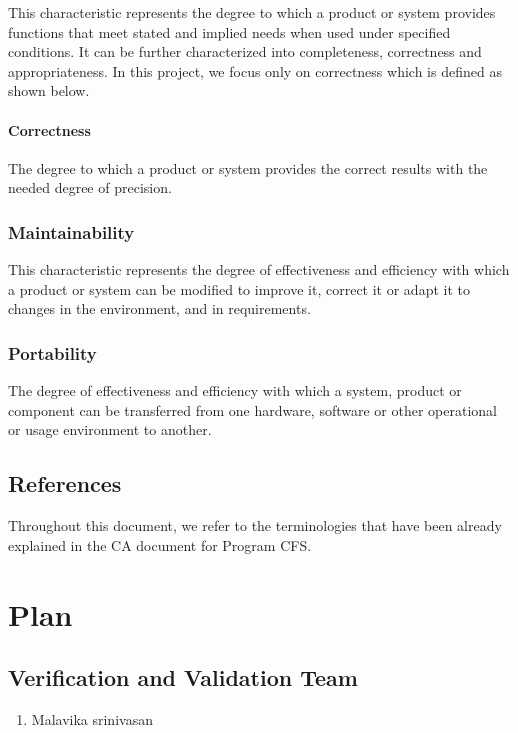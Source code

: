 \documentclass[12pt, titlepage]{article}
\newcommand{\famname}{CFS} %
\begin{document}
This characteristic represents the degree to which a product or system provides
functions that meet stated and implied needs when used under specified
conditions. It can be further characterized into completeness, correctness and
appropriateness. In this project, we focus only on correctness which is defined as shown below.
\paragraph{Correctness }
The degree to which a product or system provides the correct results with the
needed degree of precision.

\subsubsection{Maintainability}
This characteristic represents the degree of effectiveness and efficiency with
which a product or system can be modified to improve it, correct it or adapt it
to changes in the environment, and in requirements. 

\subsubsection{Portability}
The degree of effectiveness and efficiency with which a system, product or
component can be transferred from one hardware, software or other operational
or usage environment to another. 


\subsection{References}

Throughout this document, we refer to the terminologies that have been already explained in the CA document for Program \famname{}.

\section{Plan}
	
\subsection{Verification and Validation Team}

\begin{enumerate}
	\item Malavika srinivasan
\end{enumerate}
\end{document}
